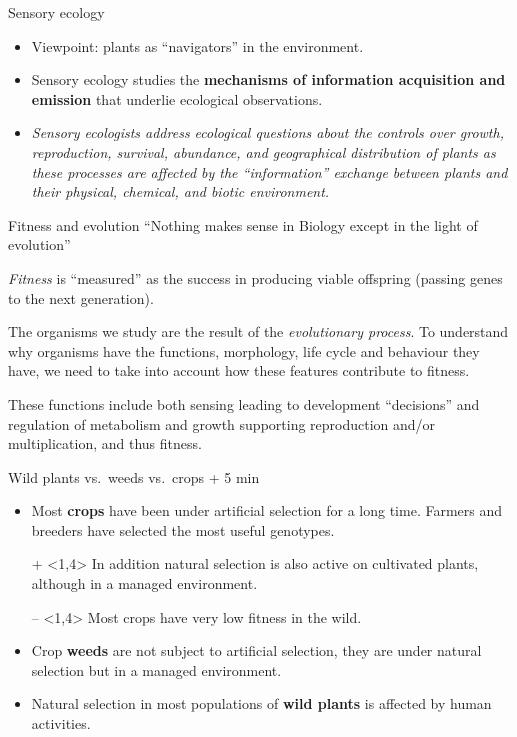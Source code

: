 \documentclass[10pt]{beamer}
\begin{document}
\begin{frame}{Sensory ecology}
    \begin{itemize}
        \item Viewpoint: plants as ``navigators'' in the environment.
        \item Sensory ecology studies the \textbf{mechanisms of information acquisition and emission}
        that underlie ecological observations.
        \item \emph{Sensory ecologists address ecological questions about
        the controls over growth, reproduction, survival, abundance,
        and geographical distribution of plants as these processes
        are affected by the ``information'' exchange between plants and their
        physical, chemical, and biotic environment.}
    \end{itemize}
\end{frame}

\begin{frame}{Fitness and evolution}
    \Attention ``Nothing makes sense in Biology except in the light of evolution''

    \vspace{0.5ex}
       \emph{Fitness} is ``measured'' as the success in producing viable offspring (passing genes to the next generation).

       The organisms we study are the result of the \emph{evolutionary process}. To understand why organisms have the functions, morphology, life cycle and behaviour they have, we need to take into account how these features contribute to fitness.

       These functions include both sensing leading to development ``decisions'' and regulation of metabolism and growth supporting reproduction and/or multiplication, and thus fitness.
\end{frame}

\begin{frame}{Wild plants vs.\ weeds vs.\ crops  + 5 min}
    \begin{itemize}

        \item<1,4> Most \textbf{crops} have been under artificial selection for a
        long time. Farmers and breeders have selected the most useful
        genotypes.

        \item[{\small +}]<1,4> In addition natural selection is also active on cultivated plants,
        although in a managed environment. \DExamples

        \item[{\small --}]<1,4> Most crops have very low fitness in the wild. \DExamples

        \item<2,4> Crop \textbf{weeds} are not subject to artificial selection,
        they are under natural selection but in a managed environment. \DExamples

        \item<3,4> Natural selection in most populations of \textbf{wild plants} is affected by human activities. \DExamples
    \end{itemize}
\end{frame}
\end{document}
